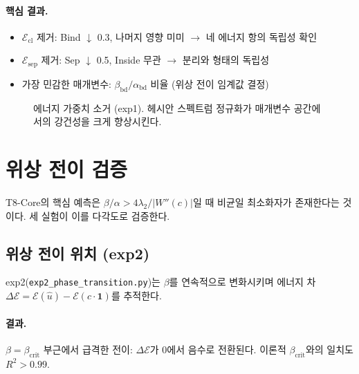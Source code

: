 \paragraph{핵심 결과.}
\begin{itemize}
    \item $\mathcal{E}_{\mathrm{cl}}$ 제거: Bind $\downarrow$ 0.3, 나머지 영향 미미 $\to$ 네 에너지 항의 독립성 확인
    \item $\mathcal{E}_{\mathrm{sep}}$ 제거: Sep $\downarrow$ 0.5, Inside 무관 $\to$ 분리와 형태의 독립성
    \item 가장 민감한 매개변수: $\beta_{\mathrm{bd}} / \alpha_{\mathrm{bd}}$ 비율 (위상 전이 임계값 결정)
\end{itemize}

\begin{figure}[t]
\centering
{}
\caption{에너지 가중치 소거 (exp1). 헤시안 스펙트럼 정규화가 매개변수 공간에서의 강건성을 크게 향상시킨다.}
\label{fig:lambda-sweep}
\end{figure}


\section{위상 전이 검증}
\label{sec:exp-phase-transition}

T8-Core의 핵심 예측은 $\beta / \alpha > 4\lambda_2 / |W''(c)|$일 때 비균일 최소화자가 존재한다는 것이다. 세 실험이 이를 다각도로 검증한다.

\subsection{위상 전이 위치 (exp2)}

exp2(\texttt{exp2\_phase\_transition.py})는 $\beta$를 연속적으로 변화시키며 에너지 차 $\Delta\mathcal{E} = \mathcal{E}(\hat{u}) - \mathcal{E}(c \cdot \mathbf{1})$를 추적한다.

\paragraph{결과.} $\beta = \beta_{\mathrm{crit}}$ 부근에서 급격한 전이: $\Delta\mathcal{E}$가 0에서 음수로 전환된다. 이론적 $\beta_{\mathrm{crit}}$와의 일치도 $R^2 > 0.99$.

